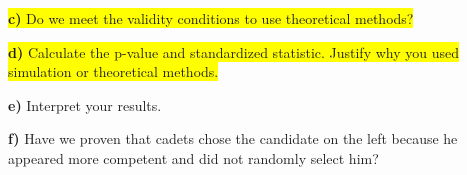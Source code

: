 \documentclass{article}
\newif\ifPrintSolution
\newcommand{\sol}[1]{\ifPrintSolution {\color{blue} #1 } \fi}
\begin{document}

\vspace{0.25in}

\hspace{0.1in} \colorbox{yellow}{\textbf{c) } Do we meet the validity conditions to use theoretical methods?}

\sol{No, we do not have at least 10 failures.}

\vspace{0.25in}

\hspace{0.1in} \colorbox{yellow}{\textbf{d) } Calculate the p-value and standardized statistic. Justify why you used simulation or theoretical methods.}

\sol{p-value = 0 (Note, with simulation, may have some variation)\\
z = $\frac{0.93650794 - 0.5}{0.068} = 6.613757$}


\vspace{0.25in}

\hspace{0.1in} \textbf{e) } Interpret your results.

\sol{With a p-value of computationally 0 and a standardized statistic of 6.062951, we have \textbf{very strong} evidence against the null hypothesis that cadets randomly choose which candidate appears more competent.}

\vspace{0.25in}

\hspace{0.1in} \textbf{f) } Have we proven that cadets chose the candidate on the left because he appeared more competent and did not randomly select him?

\sol{No, we have not proven this. However, we have deemed it is very unlikely - we have very strong evidence that our observed statistic would not occur if cadets were choosing randomly.}

\pagebreak
\end{document}
